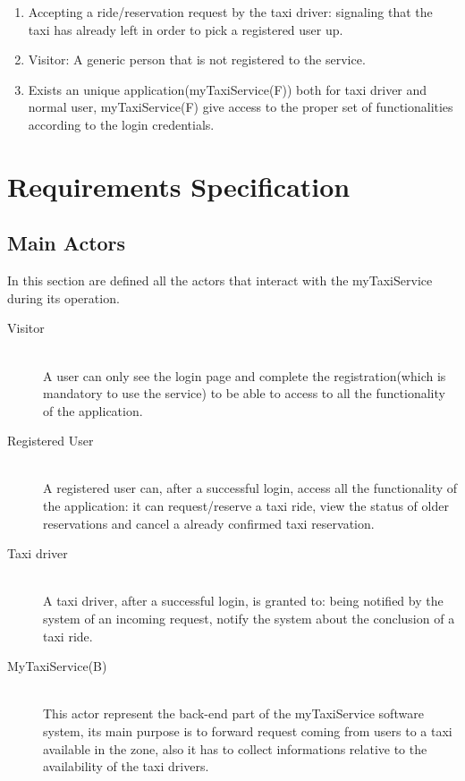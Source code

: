 \documentclass[11pt]{article} %
\begin{document}
\begin{enumerate}
        \item Accepting a ride/reservation request by the taxi driver: signaling that the taxi has already left in order to pick a registered user up.

        \item Visitor: A generic person that is not registered to the service.

        \item Exists an unique application(myTaxiService(F)) both for taxi driver and normal user, myTaxiService(F) give access to the proper set of functionalities
        according to the login credentials.
    \end{enumerate}

\section{Requirements Specification}
  \subsection{Main Actors}
    In this section are defined all the actors that interact with the myTaxiService during its operation.
    \begin{description}
      \item [Visitor] \hfill \\
          A user can only see the login page and complete the registration(which is mandatory to use the service)
          to be able to access to all the functionality of the application.

      \item [Registered User]\hfill \\
          A registered user can, after a successful login, access all the functionality of the application: it can
          request/reserve a taxi ride, view the status of older reservations and cancel a already confirmed taxi reservation.

      \item [Taxi driver] \hfill \\
          A taxi driver, after a successful login, is granted to: being notified by the system of an incoming request,
          notify the system about the conclusion of a taxi ride.

      \item [MyTaxiService(B)] \hfill \\
          This actor represent the back-end part of the myTaxiService software system, its main purpose is to forward request
          coming from users to a taxi available in the zone, also it has to collect informations relative to the availability
          of the taxi drivers.
    \end{description}
\end{document}
